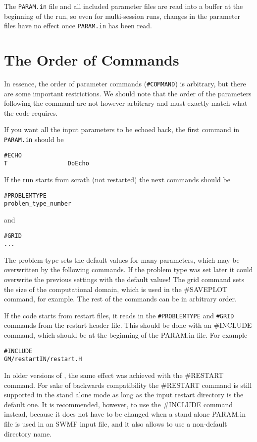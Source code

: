 The {\tt PARAM.in} file and all included parameter files are read into 
a buffer 
at the beginning of the run, so even for multi-session runs, changes in
the parameter files have no effect once {\tt PARAM.in} has been read.

\section{The Order of Commands \label{section:order}}

In essence, the order of parameter commands ({\tt \#COMMAND}) is arbitrary, 
but there are some important restrictions.  We should note that the 
order of the parameters following the command are not however arbitrary 
and must exactly match what the code requires.  

If you want all the input parameters to be echoed back, the first
command in {\tt PARAM.in} should be
\begin{verbatim}
#ECHO
T                 DoEcho
\end{verbatim}
If the run starts from scrath (not restarted) the next commands should be
\begin{verbatim}
#PROBLEMTYPE
problem_type_number
\end{verbatim}
and 
\begin{verbatim}
#GRID
...
\end{verbatim}
The problem type sets the default values for many parameters,
which may be overwritten by the following commands. If the 
problem type was set later it could overwrite the previous
settings with the default values!
The grid command sets the size of the computational domain,
which is used in the \#SAVEPLOT command, for example.
The rest of the commands can be in arbitrary order.

If the code starts from restart files, it reads in the
{\tt \#PROBLEMTYPE} and {\tt \#GRID} commands from the 
restart header file.
This should be done with an \#INCLUDE command, which
should be at the beginning of the PARAM.in file. For example
\begin{verbatim}
#INCLUDE
GM/restartIN/restart.H
\end{verbatim}
In older versions of \BATSRUS, the same effect was achieved 
with the \#RESTART command. For sake of backwards compatibility
the \#RESTART command is still supported in
the stand alone mode as long as the input restart directory
is the default one. It is recommended, however, to use
the \#INCLUDE command instead, because it does not have
to be changed when a stand alone PARAM.in file is used
in an SWMF input file, and it also allows to use a non-default
directory name.

